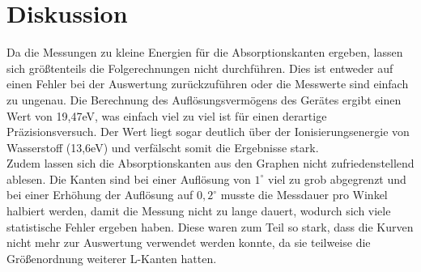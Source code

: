 \section{Diskussion}
Da die Messungen zu kleine Energien für die Absorptionskanten ergeben, lassen sich größtenteils die Folgerechnungen nicht durchführen. Dies ist entweder auf einen Fehler bei der Auswertung zurückzuführen oder die Messwerte sind einfach zu ungenau. Die Berechnung des Auflösungsvermögens des Gerätes ergibt einen Wert von 19,47eV, was einfach viel zu viel ist für einen derartige Präzisionsversuch. Der Wert liegt sogar deutlich über der Ionisierungsenergie von Wasserstoff (13,6eV) und verfälscht somit die Ergebnisse stark.\\
Zudem lassen sich die Absorptionskanten aus den Graphen nicht zufriedenstellend ablesen. Die Kanten sind bei einer Auflösung von $1^\circ$ viel zu grob abgegrenzt und bei einer Erhöhung der Auflösung auf $0,2^\circ$ musste die Messdauer pro Winkel halbiert werden, damit die Messung nicht zu lange dauert, wodurch sich viele statistische Fehler ergeben haben. Diese waren zum Teil so stark, dass die Kurven nicht mehr zur Auswertung verwendet werden konnte, da sie teilweise die Größenordnung weiterer L-Kanten hatten.



